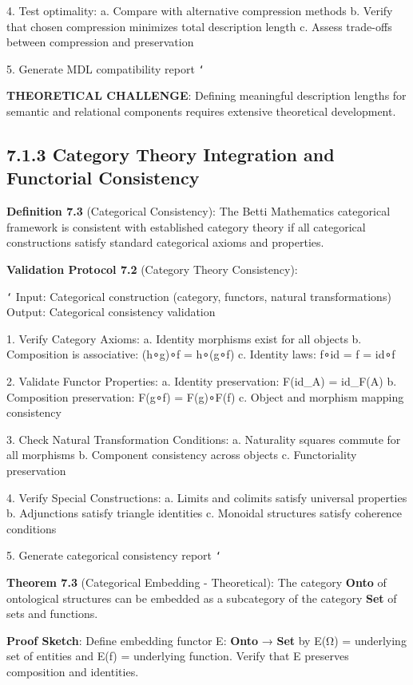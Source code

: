 4. Test optimality:
   a. Compare with alternative compression methods
   b. Verify that chosen compression minimizes total description length
   c. Assess trade-offs between compression and preservation
   
5. Generate MDL compatibility report
\texttt{`}

\textbf{THEORETICAL CHALLENGE}: Defining meaningful description lengths for semantic and relational components requires extensive theoretical development.

\subsection{7.1.3 Category Theory Integration and Functorial Consistency}

\textbf{Definition 7.3} (Categorical Consistency): The Betti Mathematics categorical framework is consistent with established category theory if all categorical constructions satisfy standard categorical axioms and properties.

\textbf{Validation Protocol 7.2} (Category Theory Consistency):

\texttt{`}
Input: Categorical construction (category, functors, natural transformations)
Output: Categorical consistency validation

1. Verify Category Axioms:
   a. Identity morphisms exist for all objects
   b. Composition is associative: (h∘g)∘f = h∘(g∘f)
   c. Identity laws: f∘id = f = id∘f
   
2. Validate Functor Properties:
   a. Identity preservation: F(id_A) = id_F(A)
   b. Composition preservation: F(g∘f) = F(g)∘F(f)
   c. Object and morphism mapping consistency
   
3. Check Natural Transformation Conditions:
   a. Naturality squares commute for all morphisms
   b. Component consistency across objects
   c. Functoriality preservation
   
4. Verify Special Constructions:
   a. Limits and colimits satisfy universal properties
   b. Adjunctions satisfy triangle identities
   c. Monoidal structures satisfy coherence conditions
   
5. Generate categorical consistency report
\texttt{`}

\textbf{Theorem 7.3} (Categorical Embedding - Theoretical): The category \textbf{Onto} of ontological structures can be embedded as a subcategory of the category \textbf{Set} of sets and functions.

\textbf{Proof Sketch}: Define embedding functor E: \textbf{Onto} → \textbf{Set} by E(Ω) = underlying set of entities and E(f) = underlying function. Verify that E preserves composition and identities.

